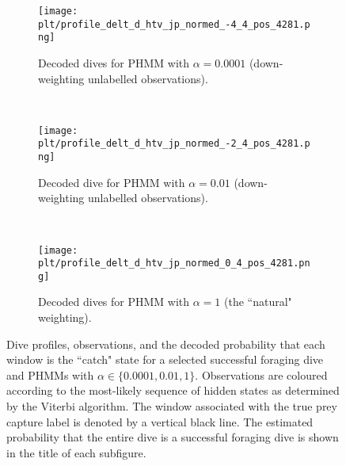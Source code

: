 \begin{figure}
    \centering
    \begin{subfigure}[t]{0.45\textwidth}
        \centering
        \texttt{[image: plt/profile\_delt\_d\_htv\_jp\_normed\_-4\_4\_pos\_4281.png]}
        \caption{Decoded dives for PHMM with $\alpha = 0.0001$ (down-weighting unlabelled observations).}
    \end{subfigure}
    ~
    \begin{subfigure}[t]{0.45\textwidth}
        \centering
        \texttt{[image: plt/profile\_delt\_d\_htv\_jp\_normed\_-2\_4\_pos\_4281.png]}
        \caption{Decoded dive for PHMM with $\alpha = 0.01$ (down-weighting unlabelled observations).}
    \end{subfigure}
    \\
    \begin{subfigure}[t]{0.45\textwidth}
        \centering
        \texttt{[image: plt/profile\_delt\_d\_htv\_jp\_normed\_0\_4\_pos\_4281.png]}
        \caption{Decoded dives for PHMM with $\alpha = 1$ (the ``natural" weighting).}
    \end{subfigure}
    \caption{Dive profiles, observations, and the decoded probability that each window is the ``catch" state for a selected successful foraging dive and PHMMs with $\alpha \in \{0.0001,0.01,1\}$. Observations are coloured according to the most-likely sequence of hidden states as determined by the Viterbi algorithm. The window associated with the true prey capture label is denoted by a vertical black line. The estimated probability that the entire dive is a successful foraging dive is shown in the title of each subfigure.}
    \label{fig:profiles_4281}
\end{figure}